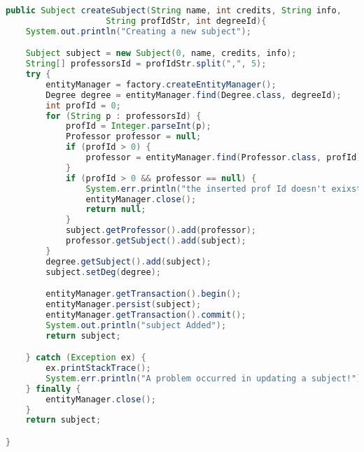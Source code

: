 \begin{lstlisting}[language=Java,  basicstyle=\footnotesize]
public Subject createSubject(String name, int credits, String info, 
					String profIdStr, int degreeId){
	System.out.println("Creating a new subject");

	Subject subject = new Subject(0, name, credits, info);
	String[] professorsId = profIdStr.split(",", 5);
	try {
		entityManager = factory.createEntityManager();
		Degree degree = entityManager.find(Degree.class, degreeId);
		int profId = 0;
		for (String p : professorsId) {
			profId = Integer.parseInt(p);
			Professor professor = null;
			if (profId > 0) {
				professor = entityManager.find(Professor.class, profId);
			}
			if (profId > 0 && professor == null) {
				System.err.println("the inserted prof Id doesn't exixst");
				entityManager.close();
				return null;
			}
			subject.getProfessor().add(professor);
			professor.getSubject().add(subject);
		}
		degree.getSubject().add(subject);
		subject.setDeg(degree);

		entityManager.getTransaction().begin();
		entityManager.persist(subject);
		entityManager.getTransaction().commit();
		System.out.println("subject Added");
		return subject;

	} catch (Exception ex) {
		ex.printStackTrace();
		System.err.println("A problem occurred in updating a subject!");
	} finally {
		entityManager.close();
	}
	return subject;

}
\end{lstlisting}